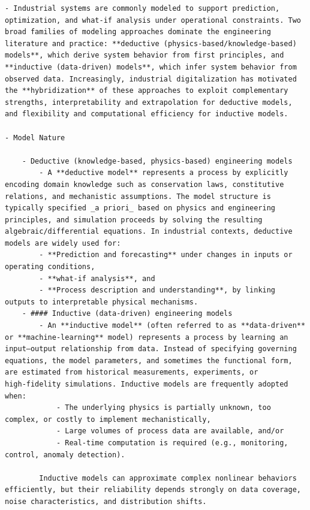 \documentclass[
]{article}
\begin{document}
\begin{verbatim}
- Industrial systems are commonly modeled to support prediction, optimization, and what‑if analysis under operational constraints. Two broad families of modeling approaches dominate the engineering literature and practice: **deductive (physics‑based/knowledge‑based) models**, which derive system behavior from first principles, and **inductive (data‑driven) models**, which infer system behavior from observed data. Increasingly, industrial digitalization has motivated the **hybridization** of these approaches to exploit complementary strengths, interpretability and extrapolation for deductive models, and flexibility and computational efficiency for inductive models.

- Model Nature

    - Deductive (knowledge‑based, physics‑based) engineering models
        - A **deductive model** represents a process by explicitly encoding domain knowledge such as conservation laws, constitutive relations, and mechanistic assumptions. The model structure is typically specified _a priori_ based on physics and engineering principles, and simulation proceeds by solving the resulting algebraic/differential equations. In industrial contexts, deductive models are widely used for:
        - **Prediction and forecasting** under changes in inputs or operating conditions,
        - **what‑if analysis**, and
        - **Process description and understanding**, by linking outputs to interpretable physical mechanisms.
    - #### Inductive (data‑driven) engineering models
        - An **inductive model** (often referred to as **data‑driven** or **machine‑learning** model) represents a process by learning an input–output relationship from data. Instead of specifying governing equations, the model parameters, and sometimes the functional form, are estimated from historical measurements, experiments, or high‑fidelity simulations. Inductive models are frequently adopted when:
            - The underlying physics is partially unknown, too complex, or costly to implement mechanistically,
            - Large volumes of process data are available, and/or
            - Real‑time computation is required (e.g., monitoring, control, anomaly detection).
        
        Inductive models can approximate complex nonlinear behaviors efficiently, but their reliability depends strongly on data coverage, noise characteristics, and distribution shifts.
        

\end{verbatim}
\end{document}
